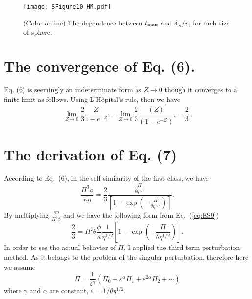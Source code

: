 \documentclass[aps,prl,superscriptaddress]{revtex4}  %
\begin{document}
%
\begin{figure}[h!]
\texttt{[image: SFigure10\_HM.pdf]}
\caption{(Color online) The dependence between $t_{ {\rm max}}$ and $\delta_m / v_i$ for each size of sphere.  \label{fig:Fig2C}  }
\end{figure}
%


\section{The convergence of Eq. (6).}

Eq. (6) is seemingly an indeterminate form as $Z \rightarrow 0$ though it converges to a finite limit as follows. Using L'H{\^{o}}pital's rule, then we have
%
\begin{equation}
\lim_{Z \to 0} \frac{2}{3} \frac{Z}{1-e^{-Z}} = \lim_{Z \to 0} \frac{2}{3} \frac{\left(Z \right)^{'}}{\left(1-e^{-Z}\right)^{'}} =  \frac{2}{3} .
\label{eq:ES8a}
\end{equation}
%


\section{The derivation of Eq. (7)}

According to Eq.~(6), in the self-similarity of the first class, we have
%
\begin{equation}
\frac{\Pi^3 \phi}{\kappa \eta} = \frac{2}{3}\frac{ \frac{\Pi}{\theta \eta^{1/2}} }{\left[1 - \exp \left( -\frac{\Pi}{\theta \eta^{1/2}} \right) \right]}.
\label{eq:ES9}
\end{equation}
%
By multiplying $\frac{\kappa \eta}{\Pi^3 \phi}$ and we have the following form from Eq.~(\ref{eq:ES9}) 
%
\begin{equation}
\frac{2}{3} = \Pi^2 \theta \frac{\phi }{\kappa} \frac{1}{\eta^{1/2}}\left[1 - \exp \left( -\frac{\Pi}{\theta \eta^{1/2}} \right) \right].
\label{eq:ES10}
\end{equation}
%
In order to see the actual behavior of $\Pi$, I applied the third term perturbation method. As it belongs to the problem of the singular perturbation\cite{Holmes}, therefore here we assume
%
\begin{equation}
\Pi = \frac{1}{\varepsilon^{\gamma} } \left( \Pi_0 + \varepsilon^{\alpha} \Pi_1 + \varepsilon^{2\alpha} \Pi_2 + \cdots \right)
\label{eq:ES11}
\end{equation}
%
where $\gamma$ and $\alpha$ are constant, $\varepsilon = 1/ \theta \eta^{1/2}$.
\end{document}
